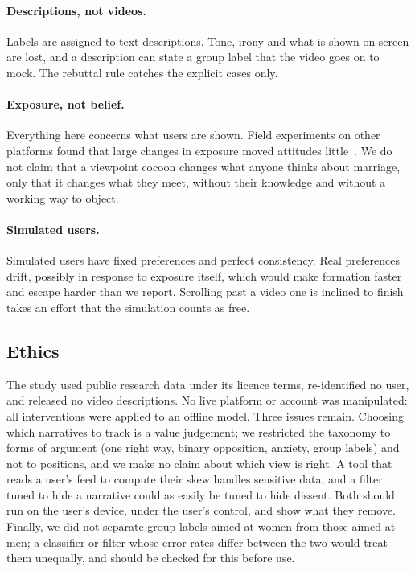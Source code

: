 \paragraph{Descriptions, not videos.} Labels are assigned to text descriptions. Tone, irony and what is shown on screen are lost, and a description can state a group label that the video goes on to mock. The rebuttal rule catches the explicit cases only.

\paragraph{Exposure, not belief.} Everything here concerns what users are shown. Field experiments on other platforms found that large changes in exposure moved attitudes little~\citep{guess2023feed,nyhan2023likeminded}. We do not claim that a viewpoint cocoon changes what anyone thinks about marriage, only that it changes what they meet, without their knowledge and without a working way to object.

\paragraph{Simulated users.} Simulated users have fixed preferences and perfect consistency. Real preferences drift, possibly in response to exposure itself, which would make formation faster and escape harder than we report. Scrolling past a video one is inclined to finish takes an effort that the simulation counts as free.

\subsection{Ethics}

The study used public research data under its licence terms, re-identified no user, and released no video descriptions. No live platform or account was manipulated: all interventions were applied to an offline model. Three issues remain. Choosing which narratives to track is a value judgement; we restricted the taxonomy to forms of argument (one right way, binary opposition, anxiety, group labels) and not to positions, and we make no claim about which view is right. A tool that reads a user's feed to compute their skew handles sensitive data, and a filter tuned to hide a narrative could as easily be tuned to hide dissent. Both should run on the user's device, under the user's control, and show what they remove. Finally, we did not separate group labels aimed at women from those aimed at men; a classifier or filter whose error rates differ between the two would treat them unequally, and should be checked for this before use.

